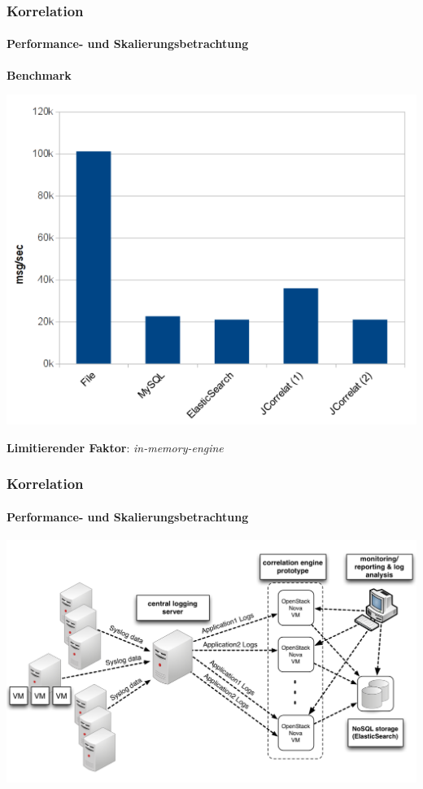 \begin{frame}
\frametitle{Korrelation}
\framesubtitle{Performance- und Skalierungsbetrachtung}

\begin{center}
    \textbf{Benchmark}
    
    \includegraphics[scale=0.4]{img/benchmark.png}
    
    \color{red}\textbf{Limitierender Faktor}: \textit{in-memory-engine}
\end{center}
\end{frame}


\begin{frame}
\frametitle{Korrelation}
\framesubtitle{Performance- und Skalierungsbetrachtung}

\begin{center}
    \includegraphics[scale=0.3]{img/schema_correlat-00.png}
\end{center}

\end{frame}